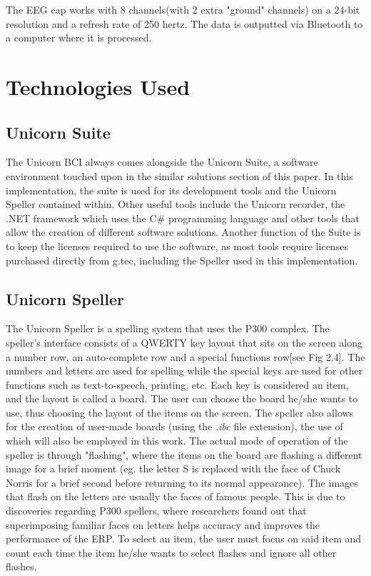 The EEG cap works with 8 channels(with 2 extra "ground" channels) on a 24-bit resolution and a refresh rate of 250 hertz. The data is outputted via Bluetooth to a computer where it is processed.


\section{Technologies Used}
\subsection{Unicorn Suite}
The Unicorn BCI always comes alongside the Unicorn Suite, a software environment touched upon in the similar solutions section of this paper. In this implementation, the suite is used for its development tools and the Unicorn Speller contained within. Other useful tools include the Unicorn recorder, the .NET framework which uses the C\# programming language and other tools that allow the creation of different software solutions. Another function of the Suite is to keep the licenses required to use the software, as most tools require licenses purchased directly from g.tec\cite{Unicorn_Shop}, including the Speller used in this implementation.


\subsection{Unicorn Speller}
The Unicorn Speller is a spelling system that uses the P300 complex\cite{UnicornSuite_Manual}. The speller's interface consists of a QWERTY key layout that sits on the screen along a number row, an auto-complete row and a special functions row[see Fig 2.4]. The numbers and letters are used for spelling while the special keys are used for other functions such as text-to-speech, printing, etc. Each key is considered an item, and the layout is called a board. The user can choose the board he/she wants to use, thus choosing the layout of the items on the screen. The speller also allows for the creation of user-made boards (using the \textit{.ibc} file extension), the use of which will also be employed in this work. 
\vspace{\baselineskip}\newline
The actual mode of operation of the speller is through "flashing"\cite{UnicornSuite_Manual}, where the items on the board are flashing a different image for a brief moment (eg. the letter S is replaced with the face of Chuck Norris for a brief second before returning to its normal appearance). The images that flash on the letters are usually the faces of famous people. This is due to discoveries regarding P300 spellers, where researchers found out that superimposing familiar faces on letters helps accuracy and improves the performance of the ERP\cite{Li_2015}\cite{Kaufmann_2011}. To select an item, the user must focus on said item and count each time the item he/she wants to select flashes and ignore all other flashes\cite{UnicornSuite_Manual}.

